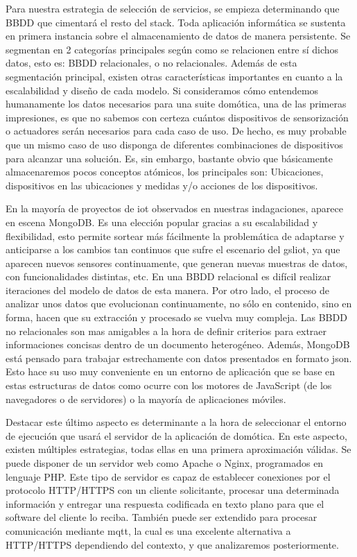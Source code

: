 Para nuestra estrategia de selección de servicios, se empieza determinando que BBDD que cimentará el resto del stack. Toda aplicación informática se sustenta en primera instancia sobre el almacenamiento de datos de manera persistente. Se segmentan en 2 categorías principales según como se relacionen entre sí dichos datos, esto es: BBDD relacionales, o no relacionales. Además de esta segmentación principal, existen otras características importantes en cuanto a la escalabilidad y diseño de cada modelo. Si consideramos cómo entendemos humanamente los datos necesarios para una suite domótica, una de las primeras impresiones, es que no sabemos con certeza cuántos dispositivos de sensorización o actuadores serán necesarios para cada caso de uso. De hecho, es muy probable que un mismo caso de uso disponga de diferentes combinaciones de dispositivos para alcanzar una solución. Es, sin embargo, bastante obvio que básicamente almacenaremos pocos conceptos atómicos, los principales son: Ubicaciones, dispositivos en las ubicaciones y medidas y/o acciones de los dispositivos.

\vspace{1cm}

En la mayoría de proyectos de \gls{iot} observados en nuestras indagaciones, aparece en escena MongoDB. Es una elección popular gracias a su escalabilidad y flexibilidad, esto permite sortear más fácilmente la problemática de adaptarse y anticiparse a los cambios tan continuos que sufre el escenario del gsl{iot}, ya que aparecen nuevos sensores continuamente, que generan nuevas muestras de datos, con funcionalidades distintas, etc. En una BBDD relacional es difícil realizar iteraciones del modelo de datos de esta manera. Por otro lado, el proceso de analizar unos datos que evolucionan continuamente, no sólo en contenido, sino en forma, hacen que su extracción y procesado se vuelva muy compleja. Las BBDD no relacionales son mas amigables a la hora de definir criterios para extraer informaciones concisas dentro de un documento heterogéneo. Además, MongoDB está pensado para trabajar estrechamente con datos presentados en formato \gls{json}. Esto hace su uso muy conveniente en un entorno de aplicación que se base en estas estructuras de datos como ocurre con los motores de JavaScript (de los navegadores o de servidores) o la mayoría de aplicaciones móviles.

\vspace{1cm}

Destacar este último aspecto es determinante a la hora de seleccionar el entorno de ejecución que usará el servidor de la aplicación de domótica. En este aspecto, existen múltiples estrategias, todas ellas en una primera aproximación válidas. Se puede disponer de un servidor web como Apache o Nginx, programados en lenguaje PHP. Este tipo de servidor es capaz de establecer conexiones por el protocolo HTTP/HTTPS con un cliente solicitante, procesar una determinada información y entregar una respuesta codificada en texto plano para que el software del cliente lo reciba. También puede ser extendido para procesar comunicación mediante \gls{mqtt}, la cual es una excelente alternativa a HTTP/HTTPS dependiendo del contexto, y que analizaremos posteriormente.

